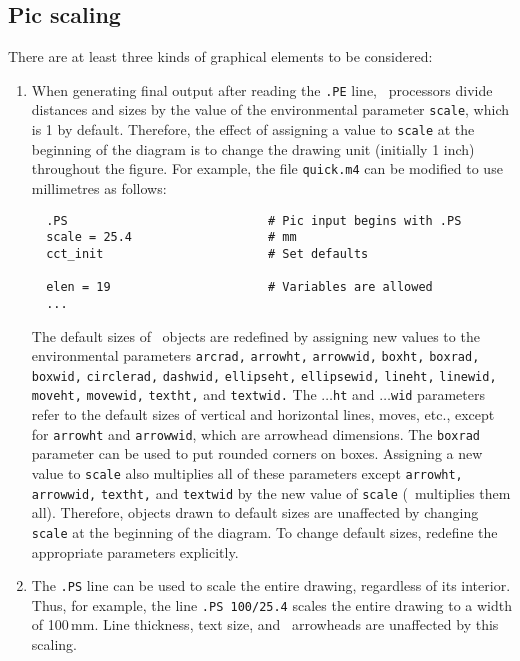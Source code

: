 \subsection{Pic scaling}
There are at least three kinds of graphical elements to be considered:
\begin{enumerate}
\item When generating final output after reading the {\tt.PE} line,
  \pic\ processors divide distances and sizes by the value of the
  environmental parameter {\tt scale}, which is 1 by default.  Therefore,
  the effect of assigning a value to {\tt scale} at the beginning of the
  diagram is to change the drawing unit (initially 1 inch) throughout
  the figure.  For example, the file {\tt quick.m4} can be modified to
  use millimetres as follows:
  \begin{verbatim}
  .PS                            # Pic input begins with .PS
  scale = 25.4                   # mm
  cct_init                       # Set defaults

  elen = 19                      # Variables are allowed
  ...
  \end{verbatim}
\vspace*{-1.5\baselineskip}
  The default sizes of \pic\ objects
  are redefined by assigning new values to the environmental parameters
  {\tt arcrad,} {\tt arrowht,} {\tt arrowwid,} {\tt boxht,} {\tt boxrad,}
  {\tt boxwid,} {\tt circlerad,} {\tt dashwid,} {\tt ellipseht,}
  {\tt ellipsewid,} {\tt lineht,} {\tt linewid,} {\tt moveht,}
  {\tt movewid,}
  {\tt textht,} and {\tt textwid.}
  The $\ldots${\tt ht} and $\ldots${\tt wid} parameters refer to the
  default sizes of vertical and horizontal lines, moves, etc., except for
  {\tt arrowht} and {\tt arrowwid}, which are arrowhead dimensions.
  The {\tt boxrad} parameter can be used to put rounded corners on boxes.
  Assigning a new value to {\tt scale} also multiplies all of these 
  parameters except {\tt arrowht,} {\tt arrowwid,} {\tt textht,} and
  {\tt textwid} by the new value of {\tt scale} (\gpic\ multiplies them all).
  Therefore, objects drawn to default sizes are unaffected by changing
  {\tt scale} at the beginning of the diagram.
  To change default sizes, redefine the appropriate parameters explicitly.

\item The {\tt .PS} line can be used to scale the entire drawing, regardless
  of its interior.  Thus, for example, the line {\tt.PS 100/25.4}
  scales the entire drawing to a width of 100$\,$mm.
  Line thickness, text size, and \dpic\ arrowheads are unaffected by
  this scaling.


\end{enumerate}
